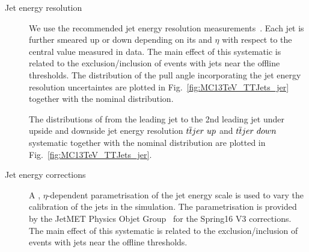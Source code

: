 \begin{description}

\item[Jet energy resolution] We use the recommended jet energy resolution measurements~\cite{twiki:JER}. Each jet is further smeared up or down depending on its \pt and $\eta$ with respect to the central value measured in data. The main effect of this systematic is related to the exclusion/inclusion of events with jets near the offline thresholds. The distribution of the pull angle incorporating the jet energy resolution uncertaintes are plotted in Fig.~\ref{fig:MC13TeV_TTJets_jer} together with the nominal distribution.

The distributions of \pullangle from the leading jet \leadingjet to the 2nd leading jet \scndleadingjet under upside and downside jet energy resolution $t\overline{t} jer\ up$ and $t\overline{t} jer\ down$ systematic together with the nominal distribution are plotted in Fig.~\ref{fig:MC13TeV_TTJets_jer}.

\item[Jet energy corrections] A \pt, $\eta$-dependent parametrisation of the jet energy scale is used to vary the calibration of the jets in the simulation. The parametrisation is provided by the JetMET Physics Objet Group~\cite{twiki:JES} for the Spring16 V3 corrections. The main effect of this systematic is related to the exclusion/inclusion of events with jets near the offline thresholds.


\end{description}
